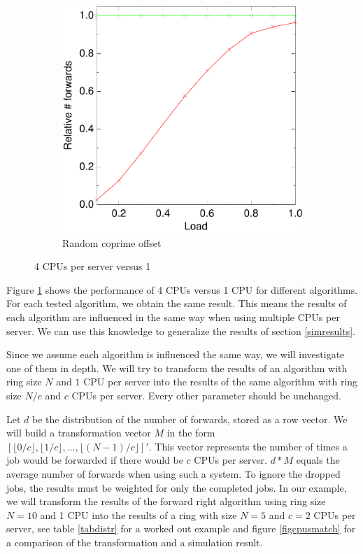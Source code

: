 \documentclass[10pt,a4paper]{article}
\begin{document}
\begin{figure}
        \vspace*{1.6em}

        \begin{subfigure}[b]{0.5\textwidth}
                \centering
                \includegraphics[width=\textwidth]{data/4randprimerandprime.pdf}
                \caption{Random coprime offset}
        \end{subfigure}
        \caption{4 CPUs per server versus 1}\label{figcpus}
\end{figure}

Figure \ref{figcpus} shows the performance of 4 CPUs versus 1 CPU for different algorithms. For each tested algorithm, we obtain the same result. This means the results of each algorithm are influenced in the same way when using multiple CPUs per server. We can use this knowledge to generalize the results of section \ref{simresults}.

Since we assume each algorithm is influenced the same way, we will investigate one of them in depth. We will try to transform the results of an algorithm with ring size $N$ and $1$ CPU per server into the results of the same algorithm with ring size $N/c$ and $c$ CPUs per server. Every other parameter should be unchanged.

Let $d$ be the distribution of the number of forwards, stored as a row vector. We will build a transformation vector $M$ in the form $[ \lfloor 0/c \rfloor,  \lfloor 1/c \rfloor, \ldots, \lfloor (N-1)/c \rfloor]'$. This vector represents the number of times a job would be forwarded if there would be $c$ CPUs per server. $d*M$ equals the average number of forwards when using such a system. To ignore the dropped jobs, the results must be weighted for only the completed jobs.
In our example, we will transform the results of the forward right algorithm using ring size $N=10$ and 1 CPU into the results of a ring with size $N=5$ and $c=2$ CPUs per server, see table \ref{tabdistr} for a worked out example and figure \ref{figcpusmatch} for a comparison of the transformation and a simulation result.
\end{document}
